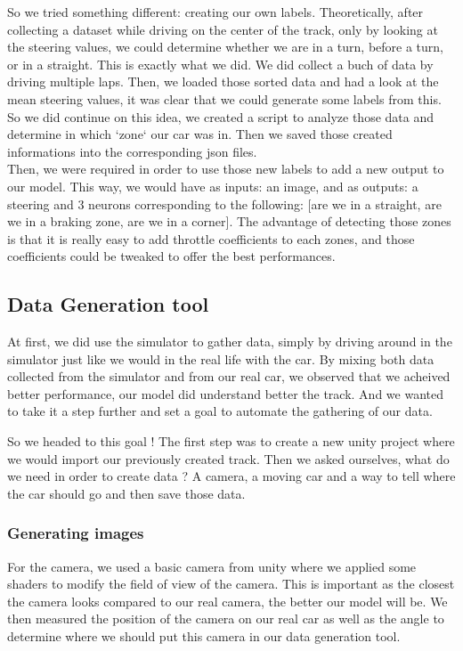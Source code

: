 \documentclass[12pt]{article}
\begin{document}
So we tried something different: creating our own labels. Theoretically, after collecting a dataset while driving on the center of the track, only by looking at the steering values, we could determine whether we are in a turn, before a turn, or in a straight. This is exactly what we did. We did collect a buch of data by driving multiple laps. Then, we loaded those sorted data and had a look at the mean steering values, it was clear that we could generate some labels from this. So we did continue on this idea, we created a script to analyze those data and determine in which `zone` our car was in. Then we saved those created informations into the corresponding json files. \\

Then, we were required in order to use those new labels to add a new output to our model. This way, we would have as inputs: an image, and as outputs: a steering and 3 neurons corresponding to the following: [are we in a straight, are we in a braking zone, are we in a corner]. The advantage of detecting those zones is that it is really easy to add throttle coefficients to each zones, and those coefficients could be tweaked to offer the best performances. 

\subsection{Data Generation tool}
At first, we did use the simulator to gather data, simply by driving around in the simulator just like we would in the real life with the car. By mixing both data collected from the simulator and from our real car, we observed that we acheived better performance, our model did understand better the track. And we wanted to take it a step further and set a goal to automate the gathering of our data.

So we headed to this goal ! The first step was to create a new unity project where we would import our previously created track. Then we asked ourselves, what do we need in order to create data ? A camera, a moving car and a way to tell where the car should go and then save those data.
\subsubsection{Generating images}
For the camera, we used a basic camera from unity where we applied some shaders to modify the field of view of the camera. This is important as the closest the camera looks compared to our real camera, the better our model will be. 
We then measured the position of the camera on our real car as well as the angle to determine where we should put this camera in our data generation tool. \\
\end{document}
